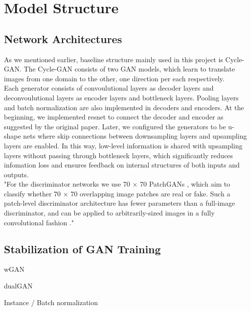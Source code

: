 \chapter{Model Structure}\label{Ch:Model}

\section{Network Architectures}

As we mentioned earlier, baseline structure mainly used in this project is Cycle-GAN. The Cycle-GAN consists of two GAN models, which learn to translate images from one domain to the other, one direction per each respectively. 
\\
Each generator consists of convoulutional layers as decoder layers and deconvoulutional layers as encoder layers and bottleneck layers. Pooling layers and batch normalization are also implemented in
decoders and encoders. At the beginning, we implemented resnet to connect the decoder and encoder as suggested by the original paper. Later, we configured the generators
to be u-shape nets where skip connections between downsampling layers and upsampling layers are enabled. In this way, low-level information is shared with upsampling layers
without passing through bottleneck layers, which significantly reduces infomation loss and ensures feedback on internal structures of both inputs and outputs.
\\
"For the discriminator
networks we use 70 × 70 PatchGANs , which
aim to classify whether 70 × 70 overlapping image patches
are real or fake. Such a patch-level discriminator architecture
has fewer parameters than a full-image discriminator,
and can be applied to arbitrarily-sized images in a fully convolutional
fashion ."
\section{Stabilization of GAN Training}

wGAN

dualGAN

Instance / Batch normalization

\endinput

